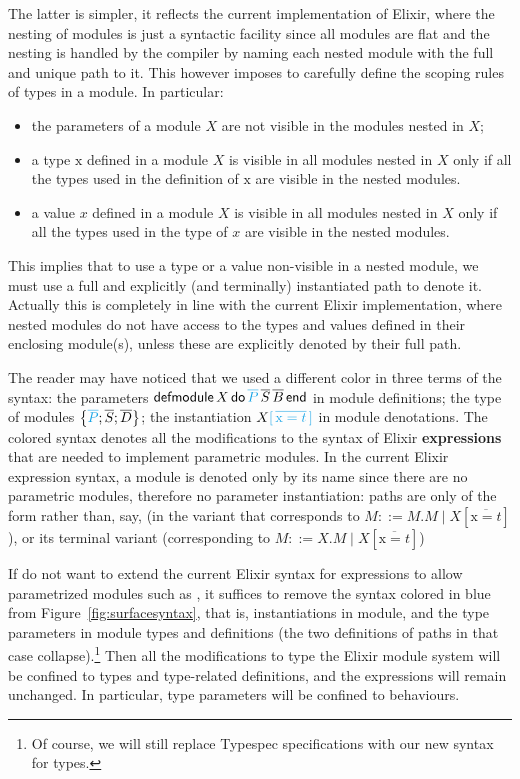\documentclass[a4paper,10pt]{article}
\DeclareMathOperator{\kwend}{\textsf{end}}
\DeclareMathOperator{\kwdo}{\textsf{do}}
\DeclareMathOperator{\kwdefm}{\textsf{defmodule}}
\newcommand{\tx}{\textrm{x}}
\begin{document}
 The latter is simpler, it reflects the current implementation of Elixir, where the nesting of modules is just a syntactic facility since all modules are flat and the nesting is handled by the compiler by naming each nested module with the full and unique path to it. This however imposes to carefully define the scoping rules of types in a module. In particular:
 \begin{itemize}  
  \item the parameters of a module $X$ are not visible in the modules nested in $X$;
  \item a type $\tx$ defined in a module $X$ is visible in all modules nested in $X$ only if all the types used in the definition of $\tx$ are visible in the nested modules.
  \item a value $x$ defined in a module $X$ is visible in all modules nested in $X$ only if all the types used in the type of $x$ are visible in the nested modules.
 \end{itemize}
 This implies that to use a type or a value non-visible in a nested module, we must use a full and explicitly (and terminally) instantiated path to denote it.
 Actually this is completely in line with the current Elixir implementation, where nested modules do not have access to the types and values defined in their enclosing module(s), unless these are explicitly denoted by their full path.

The reader may have noticed that we used a different color in three terms of the syntax: the parameters $\kwdefm X \kwdo \textcolor{Cerulean}{\overline{P}}\, \overline{S}\, \overline{B} \kwend$ in module definitions; the type of modules $\left\{\textcolor{Cerulean}{\overline{P}};\overline{S};\overline{D}\right\}$; the instantiation $X\textcolor{Cerulean}{[\,\overline{\tx=t}\,]}$ in module denotations. The colored syntax denotes all the modifications to the syntax of Elixir \textbf{expressions} that are needed to implement parametric modules. In the current  Elixir expression syntax, a module is denoted only by its name since there are no parametric modules, therefore no parameter instantiation: paths are only of the form  rather than, say,  (in the variant that corresponds to $M::= M.M \mid X[\overline{\tx=t}]$), or its terminal variant  (corresponding to $M::= X.M\mid X[\overline{\tx=t}]$)

If do not want to extend the current Elixir syntax for expressions to allow parametrized modules such as , it suffices to remove the syntax colored in blue  from Figure~\ref{fig:surfacesyntax}, that is, instantiations in module, and the type parameters in module types and definitions (the two definitions of paths in that case collapse).\footnote{Of course, we will still replace Typespec specifications with our new syntax for types.} Then all the modifications to type the Elixir module system will be confined to types and type-related definitions, and the expressions will remain unchanged. In particular, type parameters will be confined to behaviours. 
\end{document}
